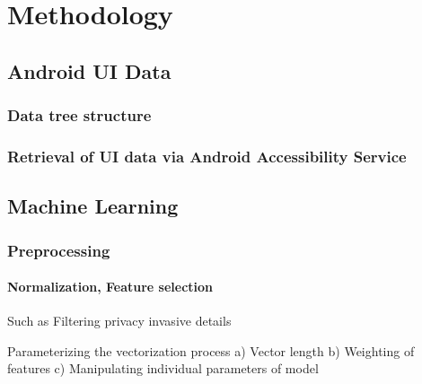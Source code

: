 \chapter{Methodology}





\section{Android UI Data}
\subsection{Data tree structure}
\subsection{Retrieval of UI data via Android Accessibility Service}

\section{Machine Learning}
\subsection{Preprocessing}
\subsubsection{Normalization, Feature selection}

Such as Filtering privacy invasive details

Parameterizing the vectorization process
             a) Vector length
             b) Weighting of features
             c) Manipulating individual parameters of model
             
